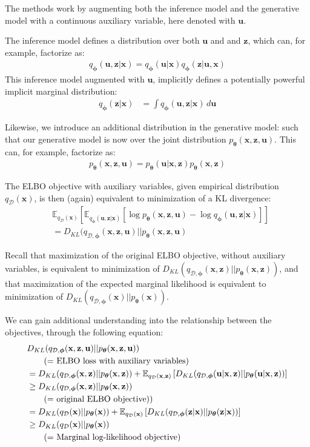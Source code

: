 \documentclass[MAL,biber]{nowfnt} %
\newcommand{\bb}[1]{\mathbf{#1}}
\newcommand{\bx}{\bb{x}}
\newcommand{\bu}{\bb{u}}
\newcommand{\bz}{\bb{z}}
\newcommand{\bT}{\boldsymbol{\theta}}
\newcommand{\bphi}{\boldsymbol{\phi}}
\newcommand{\pT}{p_{\bT}}
\newcommand{\qP}{q_{\bphi}}
\newcommand{\qD}{q_\mathcal{D}}
\newcommand{\qDP}{q_{\mathcal{D},\bphi}}
\newcommand{\Exp}[2]{\mathbb{E}_{#1}\left[#2\right]}
\begin{document}
The methods work by augmenting both the inference model and the generative model with a continuous auxiliary variable, here denoted with $\bu$.

The inference model defines a distribution over both $\bu$ and and $\bz$, which can, for example, factorize as:
\begin{align}
\qP(\bu,\bz|\bx) = \qP(\bu|\bx)\qP(\bz|\bu,\bx)
\end{align}
This inference model augmented with $\bu$, implicitly defines a potentially powerful implicit marginal distribution:
\begin{align}
\qP(\bz|\bx) &= \int \qP(\bu,\bz|\bx) \,d\bu
\end{align}

Likewise, we introduce an additional distribution in the generative model: such that our generative model is now over the joint distribution $\pT(\bx,\bz,\bu)$. This can, for example, factorize as:
\begin{align}
\pT(\bx,\bz,\bu) = \pT(\bu|\bx,\bz)\pT(\bx,\bz)
\end{align}

The ELBO objective with auxiliary variables, given empirical distribution $\qD(\bx)$, is then (again) equivalent to minimization of a KL divergence:
\begin{align}
&\Exp{\qD(\bx)}{ \Exp{\qP(\bu,\bz|\bx)}{\log \pT(\bx,\bz,\bu) - \log \qP(\bu,\bz|\bx) } }\\
&= D_{KL}(\qDP(\bx,\bz,\bu) || \pT(\bx,\bz,\bu)
\label{eq:augmentedelbo}
\end{align}

Recall that maximization of the original ELBO objective, without auxiliary variables, is equivalent to minimization of $D_{KL}(\qDP(\bx,\bz) ||\allowbreak \pT(\bx,\bz))$, and that maximization of the expected marginal likelihood is equivalent to minimization of $D_{KL}(\qDP(\bx) || \pT(\bx))$.

We can gain additional understanding into the relationship between the objectives, through the following equation:
\begin{align}
&D_{KL}(\qDP(\bx,\bz,\bu) || \pT(\bx,\bz,\bu))\\
&\tag*{(= \text{ELBO loss with auxiliary variables})}\\
&= D_{KL}(\qDP(\bx,\bz) || \pT(\bx,\bz)) + \Exp{\qD(\bx,\bz)}{D_{KL}(\qDP(\bu|\bx,\bz) || \pT(\bu|\bx,\bz))} \nonumber\\
&\geq D_{KL}(\qDP(\bx,\bz) || \pT(\bx,\bz))\\
&\tag*{(= \text{original ELBO objective)})}\nonumber\\
&= D_{KL}(\qD(\bx) || \pT(\bx)) + \Exp{\qD(\bx)}{D_{KL}(\qDP(\bz|\bx) || \pT(\bz|\bx))}\\
&\geq D_{KL}(\qD(\bx) || \pT(\bx))\\
&\tag*{(= \text{Marginal log-likelihood objective})}\nonumber
\end{align}
\end{document}
